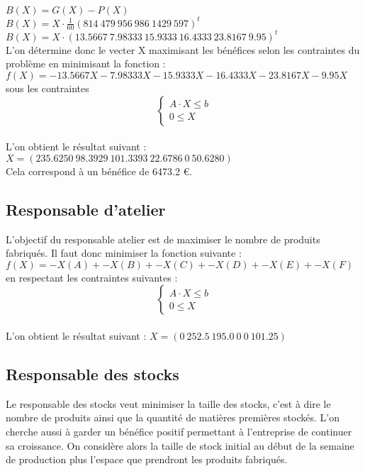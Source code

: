 \documentclass[a4paper, 11pt]{article}
\begin{document}
$B(X) = G(X) - P(X)$ \\
$B(X) = X\cdot\frac{1}{60}(814~479~956~986~1429~597)^t$ \\
$B(X) = X\cdot(13.5667~7.98333~15.9333~16.4333~23.8167~9.95)^t$ \\

L'on détermine donc le vecter X maximisant les bénéfices selon les contraintes du problème en minimisant la fonction :\\
$f(X) = -13.5667 X - 7.98333 X - 15.9333 X - 16.4333 X - 23.8167 X - 9.95 X$\\
sous les contraintes \begin{equation}
  \left\{
    \begin{split}
     A\cdot X \leq b\\ 
     0 \leq X
    \end{split}
  \right.
\end{equation}\\

L'on obtient le résultat suivant :\\
$X=(235.6250~98.3929~101.3393~22.6786~0~50.6280)$\\

Cela correspond à un bénéfice de 6473.2 €.


\subsection{Responsable d'atelier}
L'objectif du responsable atelier est de maximiser le nombre de produits fabriqués.
Il faut donc minimiser la fonction suivante : \\
$ f(X) = -X(A) + -X(B) + -X(C) + -X(D) + -X(E) + -X(F) $\\
en respectant les contraintes suivantes : \\
\begin{equation}
  \left\{
    \begin{split}
     A\cdot X \leq b\\ 
     0 \leq X
    \end{split}
  \right.
\end{equation}\\

L'on obtient le résultat suivant : $X = (0~252.5~195.0~0~0~101.25)$\\

\subsection{Responsable des stocks}
Le responsable des stocks veut minimiser la taille des stocks, c'est à dire le nombre de produits ainsi que la quantité de matières premières stockés. L'on cherche  aussi à garder un bénéfice positif permettant à l'entreprise de continuer sa croissance.
On considère alors la taille de stock initial au début de la semaine de production
plus l'espace que prendront les produits fabriqués.
\end{document}
